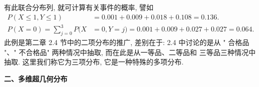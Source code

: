   有此联合分布列, 就可计算有关事件的概率, 譬如
  \begin{align*}
    P(X \leq 1, Y \leq 1)&=0.001+0.009+0.018+0.108=0.136. \\
    P(X=0)=\sum_{j=0}^{3} P(X&=0, Y=j)=0.001+0.009+0.027+0.027=0.064.
  \end{align*}
  此例是第二章 2.4 节中的二项分布的推广, 差别在于: 2.4 中讨论的是从 " 合格品 "、" 不合格品" 两种情况中抽取, 而在此是从一等品、二等品和
  三等品三种情况中抽取. 这里我们称它为三项分布, 它是一种特殊的多项分布.

  \textbf{二、多维超几何分布 }

